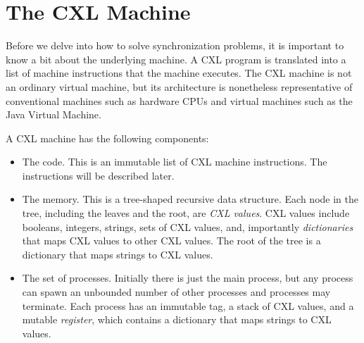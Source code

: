 \documentclass{book}
\begin{document}
\chapter{The CXL Machine}

Before we delve into how to solve synchronization problems, it is important
to know a bit about the underlying machine.  A CXL program is translated
into a list of machine instructions that the machine executes.
The CXL machine is not an ordinary virtual machine, but its architecture
is nonetheless representative of conventional machines such as hardware CPUs
and virtual machines such as the Java Virtual Machine.

A CXL machine has the following components:
\begin{itemize}
\item The code.  This is an immutable list of CXL machine instructions.  The
instructions will be described later.
\item The memory.  This is a tree-shaped recursive data structure.  Each node
in the tree, including the leaves and the root, are \emph{CXL values}.  CXL
values include booleans, integers, strings, sets of CXL values, and, importantly
\emph{dictionaries} that maps CXL values to other CXL values.
The root of the tree is a dictionary that maps strings to CXL values.
\item The set of processes.  Initially there is just the main process, but any process
can spawn an unbounded number of other processes and processes may terminate.
Each process has an immutable
tag, a stack of CXL values, and a mutable \emph{register}, which contains a
dictionary that maps strings to CXL values.
\end{itemize}
\end{document}
